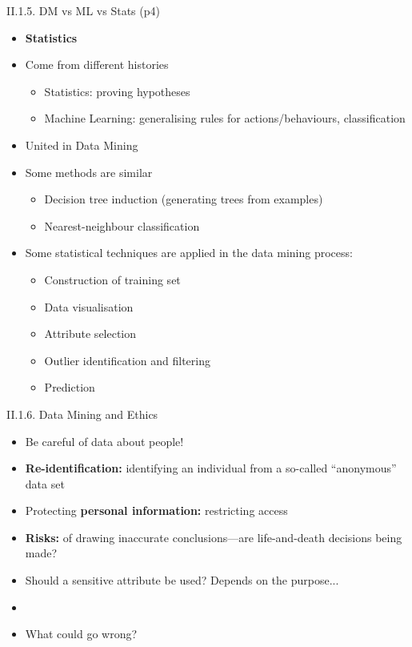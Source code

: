 \documentclass[handout]{beamer}
\newcommand{\strong}[1]{\textbf{\color{teal} #1}}
\newcommand{\stronger}[1]{\textbf{\color{purple} #1}}
\begin{document}
\begin{frame}{II.1.5. DM vs ML vs Stats (p4)}
\begin{itemize}
\item[] \stronger{Statistics}
\item Come from different histories
	\begin{itemize}
	\item Statistics: proving hypotheses
	\item Machine Learning: generalising rules for actions/behaviours, classification
	\end{itemize}
\item United in Data Mining
\item Some methods are similar
	\begin{itemize}
	\item Decision tree induction (generating trees from examples)
	\item Nearest-neighbour classification
	\end{itemize}
\item Some statistical techniques are applied in the data mining process:
	\begin{itemize}
	\item Construction of training set
	\item Data visualisation
	\item Attribute selection
	\item Outlier identification and filtering
	\item Prediction
	\end{itemize}
\end{itemize}
\end{frame}
\begin{frame}{II.1.6. Data Mining and Ethics}
\begin{itemize}
\item Be careful of data about people!
\item \strong{Re-identification:} identifying an individual from a so-called ``anonymous'' data set
\item Protecting \strong{personal information:} restricting access
\item \strong{Risks:} of drawing inaccurate conclusions---are life-and-death decisions being made?
\item Should a sensitive attribute be used? Depends on the purpose...
\item[]
\item What could go wrong?
\end{itemize}
\end{frame}
\end{document}
